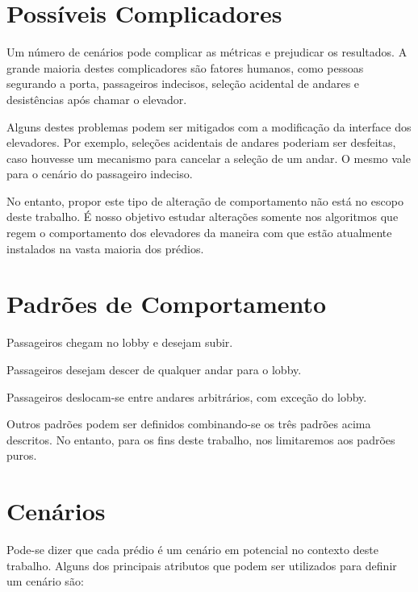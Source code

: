\section{Possíveis Complicadores}

Um número de cenários pode complicar as métricas e prejudicar os resultados. A grande maioria destes complicadores são fatores humanos, como pessoas segurando a porta, passageiros indecisos, seleção acidental de andares e desistências após chamar o elevador.

Alguns destes problemas podem ser mitigados com a modificação da interface dos elevadores. Por exemplo, seleções acidentais de andares poderiam ser desfeitas, caso houvesse um mecanismo para cancelar a seleção de um andar. O mesmo vale para o cenário do passageiro indeciso.

No entanto, propor este tipo de alteração de comportamento não está no escopo deste trabalho. É nosso objetivo estudar alterações somente nos algoritmos que regem o comportamento dos elevadores da maneira com que estão atualmente instalados na vasta maioria dos prédios.

\section{Padrões de Comportamento}

\begin{description}[leftmargin=!,labelwidth=\widthof{\bfseries interfloor}]
  \item[up peak]    Passageiros chegam no lobby e desejam subir.
  \item[down peak]  Passageiros desejam descer de qualquer andar para o lobby.
  \item[interfloor] Passageiros deslocam-se entre andares arbitrários, com exceção do lobby.
\end{description}

Outros padrões podem ser definidos combinando-se os três padrões acima
descritos. No entanto, para os fins deste trabalho, nos limitaremos aos padrões puros.

\section{Cenários}

Pode-se dizer que cada prédio é um cenário em potencial no contexto deste trabalho. Alguns dos principais atributos que podem ser utilizados para definir um cenário são:

